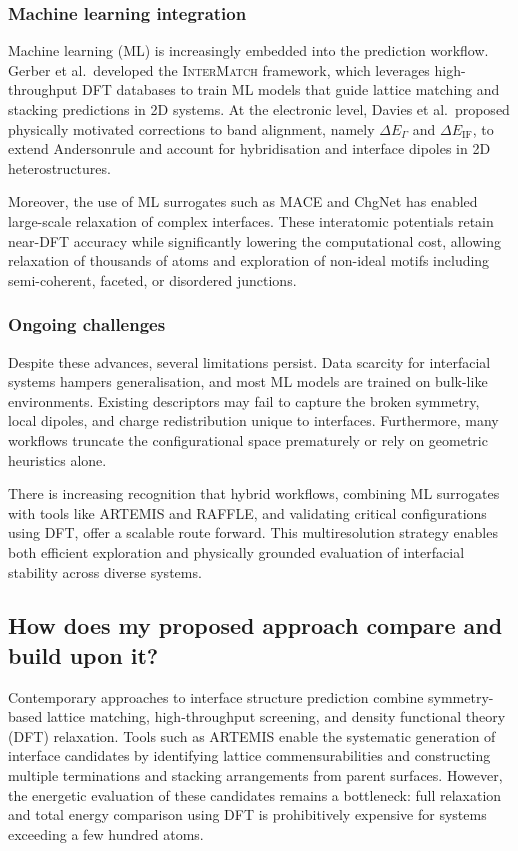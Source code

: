 \subsubsection{Machine learning integration} 
 
Machine learning (ML) is increasingly embedded into the prediction workflow. Gerber et al.\ developed the \textsc{InterMatch} framework, which leverages high-throughput DFT databases to train ML models that guide lattice matching and stacking predictions in 2D systems. At the electronic level, Davies et al.\ proposed physically motivated corrections to band alignment, namely $\Delta E_\Gamma$ and $\Delta E_{\mathrm{IF}}$, to extend Anderson\rqss rule and account for hybridisation and interface dipoles in 2D heterostructures. 
 
Moreover, the use of ML surrogates such as MACE and ChgNet has enabled large-scale relaxation of complex interfaces. These interatomic potentials retain near-DFT accuracy while significantly lowering the computational cost, allowing relaxation of thousands of atoms and exploration of non-ideal motifs including semi-coherent, faceted, or disordered junctions. 
 
\subsubsection{Ongoing challenges} 
 
Despite these advances, several limitations persist. Data scarcity for interfacial systems hampers generalisation, and most ML models are trained on bulk-like environments. Existing descriptors may fail to capture the broken symmetry, local dipoles, and charge redistribution unique to interfaces. Furthermore, many workflows truncate the configurational space prematurely or rely on geometric heuristics alone. 
 
There is increasing recognition that hybrid workflows, combining ML surrogates with tools like \textsc{ARTEMIS} and \textsc{RAFFLE}, and validating critical configurations using DFT, offer a scalable route forward. This multiresolution strategy enables both efficient exploration and physically grounded evaluation of interfacial stability across diverse systems. 
 
\subsection{How does my proposed approach compare and build upon it?} 
 
Contemporary approaches to interface structure prediction combine symmetry-based lattice matching, high-throughput screening, and density functional theory (DFT) relaxation. Tools such as \textsc{ARTEMIS} enable the systematic generation of interface candidates by identifying lattice commensurabilities and constructing multiple terminations and stacking arrangements from parent surfaces. However, the energetic evaluation of these candidates remains a bottleneck: full relaxation and total energy comparison using DFT is prohibitively expensive for systems exceeding a few hundred atoms. 
 
